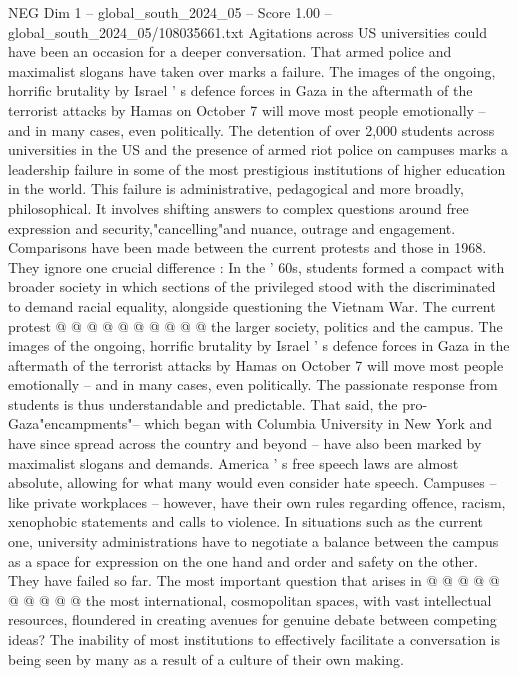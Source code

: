 \begin{textsample}{NEG Dim 1 – global\_south\_2024\_05 – Score 1.00 – global\_south\_2024\_05/108035661.txt}  \label{ex:f1_neg_370}
Agitations across US universities could have been an occasion for a deeper conversation.
That armed police and maximalist slogans have taken over marks a failure.
The images of the ongoing, horrific brutality by Israel ' s defence forces in Gaza in the aftermath of the terrorist attacks by Hamas on October 7 will move most people emotionally -- and in many cases, even politically.
The detention of over 2,000 students across universities in the US and the presence of armed riot police on campuses marks a leadership failure in some of the most prestigious institutions of higher education in the world.
This failure is administrative, pedagogical and more broadly, philosophical.
It involves shifting answers to complex questions around free expression and security,"cancelling"and nuance, outrage and engagement.
Comparisons have been made between the current protests and those in 1968.
They ignore one crucial difference : In the ' 60s, students formed a compact with broader society in which sections of the privileged stood with the discriminated to demand racial equality, alongside questioning the Vietnam War.
The current protest @ @ @ @ @ @ @ @ @ @ the larger society, politics and the campus.
The images of the ongoing, horrific brutality by Israel ' s defence forces in Gaza in the aftermath of the terrorist attacks by Hamas on October 7 will move most people emotionally -- and in many cases, even politically.
The passionate response from students is thus understandable and predictable.
That said, the pro-Gaza"encampments"-- which began with Columbia University in New York and have since spread across the country and beyond -- have also been marked by maximalist slogans and demands.
America ' s free speech laws are almost absolute, allowing for what many would even consider hate speech.
Campuses -- like private workplaces -- however, have their own rules regarding offence, racism, xenophobic statements and calls to violence.
In situations such as the current one, university administrations have to negotiate a balance between the campus as a space for expression on the one hand and order and safety on the other.
They have failed so far.
The most important question that arises in @ @ @ @ @ @ @ @ @ @ the most international, cosmopolitan spaces, with vast intellectual resources, floundered in creating avenues for genuine debate between competing ideas?
The inability of most institutions to effectively facilitate a conversation is being seen by many as a result of a culture of their own making.

\end{textsample}
